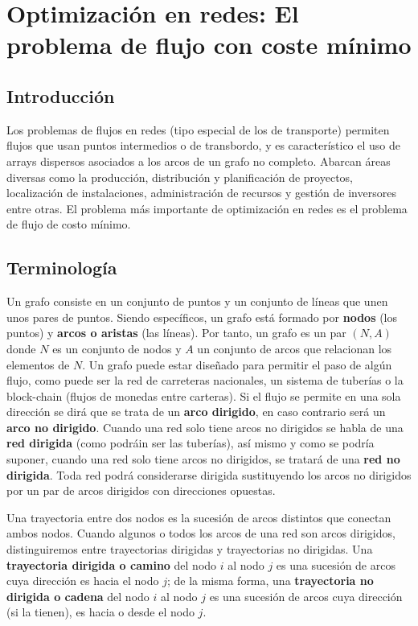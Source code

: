 \section{Optimización en redes: El problema de flujo con coste mínimo}

\subsection{Introducción}

Los problemas de flujos en redes (tipo especial de los de transporte) permiten flujos que usan puntos intermedios o
de transbordo, y es característico el uso de arrays dispersos asociados a los arcos de un grafo no completo. Abarcan áreas
diversas como la producción, distribución y planificación de proyectos, localización de instalaciones, administración
de recursos y gestión de inversores entre otras. El problema más importante de optimización en redes es el problema de
flujo de costo mínimo.

\subsection{Terminología}

Un grafo consiste en un conjunto de puntos y un conjunto de líneas que unen unos pares de puntos. Siendo específicos, un
grafo está formado por \textbf{nodos} (los puntos) y \textbf{arcos o aristas} (las líneas). Por tanto, un grafo es un par
$(N,A)$ donde $N$ es un conjunto de nodos y $A$ un conjunto de arcos que relacionan los elementos de $N$. Un grafo puede
estar diseñado para permitir el paso de algún flujo, como puede ser la red de carreteras nacionales, un sistema de tuberías
o la block-chain (flujos de monedas entre carteras). Si el flujo se permite en una sola dirección se dirá que se trata de
un \textbf{arco dirigido}, en caso contrario será un \textbf{arco no dirigido}. Cuando una red solo tiene arcos no dirigidos
se habla de una \textbf{red dirigida} (como podráin ser las tuberías), así mismo y como se podría suponer, cuando una red
solo tiene arcos no dirigidos, se tratará de una \textbf{red no dirigida}. Toda red podrá considerarse dirigida sustituyendo
los arcos no dirigidos por un par de arcos dirigidos con direcciones opuestas.

\vspace*{2mm}

Una trayectoria entre dos nodos es la sucesión de arcos distintos que conectan ambos nodos. Cuando algunos o todos los
arcos de una red son arcos dirigidos, distinguiremos entre trayectorias dirigidas y trayectorias no dirigidas. Una 
\textbf{trayectoria dirigida o camino} del nodo $i$ al nodo $j$ es una sucesión de arcos cuya dirección es hacia el nodo 
$j$; de la misma forma, una \textbf{trayectoria no dirigida o cadena} del nodo $i$ al nodo $j$ es una sucesión de arcos
cuya dirección (si la tienen), es hacia o desde el nodo $j$.

